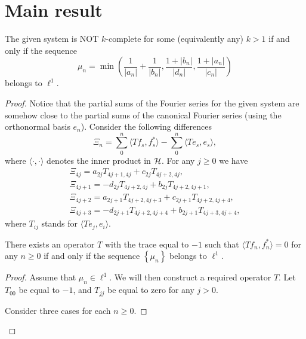 \documentclass[12pt]{amsart}
\theoremstyle{case}
\begin{document}
  \section{Main result}
    \begin{theorem}
      The given system is NOT $k$-complete for some (equivalently any) $k > 1$ if and only if the sequence
      \[
        \mu_n = \min\left(\frac{1}{|a_n|} + \frac{1}{|b_n|}, \frac{1 + |b_n|}{|d_n|}, \frac{1 + |a_n|}{|c_n|}\right)
      \]
        belongs to $\ell^1$.
    \end{theorem}
    \begin{proof}
      Notice that the partial sums of the Fourier series for the given system are somehow close to the
        partial sums of the canonical Fourier series (using the orthonormal basis $e_n$).
      Consider the following differences
      \[
        \Xi_n = \sum_0^n \langle Tf_s, f_s^* \rangle - \sum_0^n \langle Te_s, e_s \rangle,
      \]
        where $\langle \cdot, \cdot\rangle$ denotes the inner product in $\cal{H}$.
      For any $j \geq 0$ we have
      \begin{align*}
        \Xi_{4j} = a_{2j} T_{4j+1, 4j} + c_{2j} T_{4j+2, 4j},\\
        \Xi_{4j + 1} = -d_{2j} T_{4j+2, 4j} + b_{2j} T_{4j+2, 4j+1},\\
        \Xi_{4j + 2} = a_{2j+1} T_{4j+2, 4j+3} + c_{2j+1} T_{4j+2, 4j+4},\\
        \Xi_{4j + 3} = -d_{2j+1} T_{4j+2, 4j+4} + b_{2j+1} T_{4j+3, 4j+4},
      \end{align*}
      where $T_{ij}$ stands for $\langle Te_j, e_i \rangle$.
      \begin{prop}
        \label{inf-dim-statement}
        There exists an operator $T$ with the trace equal to $-1$ such that $\langle Tf_n, f_n^*\rangle = 0$ for any $n \geq 0$
          if and only if the sequence $\left\{\mu_n\right\}$ belongs to $\ell^1$.
      \end{prop}
      \begin{proof}
        Assume that $\mu_n \in \ell^1$.
        We will then construct a required operator $T$.
        Let $T_{00}$ be equal to $-1$, and $T_{jj}$ be equal to zero for any $j > 0$.

        Consider three cases for each $n \geq 0$.


\end{proof}
\end{proof}
\end{document}
